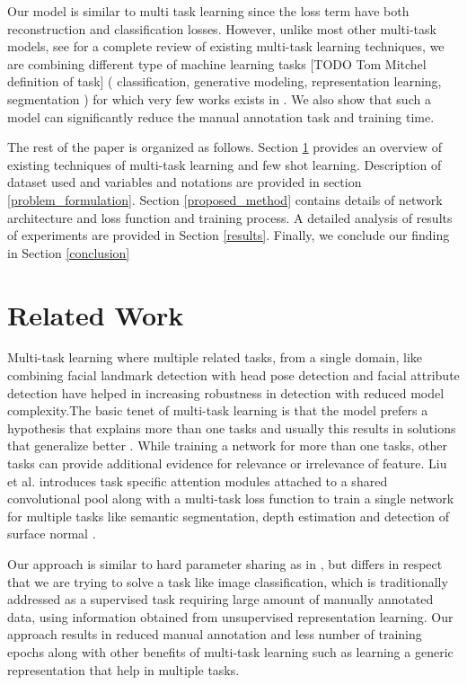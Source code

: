 \documentclass[journal]{IEEEtran}
\begin{document}
Our model is similar to multi task learning since the loss term have both reconstruction and classification losses. However, unlike most other multi-task models, see \cite{mtl_2017_ruder} \cite{mtl_2020_michael} for a complete review of existing multi-task learning techniques, we are combining  different type of machine learning tasks [TODO Tom Mitchel definition of task] ( classification, generative modeling, representation learning, segmentation )  for which very few works exists in \cite{laddernetwork}. We also show that such a model can significantly reduce the manual annotation task and training time.

The rest of the paper is organized as follows. Section \ref{related_works} provides an overview of existing techniques of multi-task learning and few shot learning. Description of dataset used and variables and notations are provided in section \ref{problem_formulation}. Section \ref{proposed_method} contains details of network architecture and loss function and training process. A detailed analysis of results of experiments are provided in Section \ref{results}. Finally, we conclude our finding in Section \ref{conclusion}


\section{Related Work} \label{related_works}
Multi-task learning where multiple related tasks, from a single domain, like combining facial landmark detection with head pose detection and facial attribute detection \cite{mtl_zhang_2014} have helped in increasing robustness in detection with reduced model complexity.The basic tenet of multi-task learning is that the model prefers a hypothesis that explains more than one tasks and usually this results in solutions that generalize better \cite{mtl_2017_ruder}. While training a network for more than one tasks, other tasks can provide additional evidence for relevance or irrelevance of feature. Liu et al. introduces task specific attention modules attached to a shared convolutional pool  along with a multi-task loss function to train a single network for multiple tasks like semantic segmentation, depth estimation and detection of surface normal \cite{mtl_liu_2019}.

Our approach is similar to hard parameter sharing as in \cite{mtl_zhang_2014} \cite{mtl_2016_dai}, but differs in respect that we are trying to solve a task like image classification, which is traditionally addressed as a supervised task requiring large amount of manually annotated data, using information obtained from  unsupervised representation learning. Our approach results in reduced manual annotation and less number of training epochs along with other benefits of multi-task learning such as learning a generic representation that help in multiple tasks.
\end{document}

